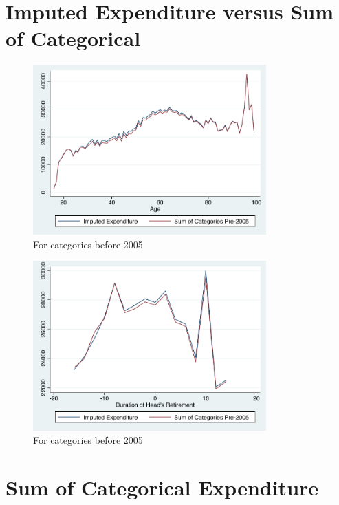 \documentclass[11pt,onecolumn]{article}
\numberwithin{figure}{section}
\begin{document}
\clearpage

\section{Imputed Expenditure versus Sum of Categorical}

\begin{figure}[h]
	\caption{For categories before 2005}
	\centering
	\includegraphics[width=0.8\textwidth]{../ConsumptionPostRetirement/Comparision_of_imputed_and_categorical_age.pdf}
\end{figure}

\begin{figure}[h]
	\caption{For categories before 2005}
	\centering
	\includegraphics[width=0.8\textwidth]{../ConsumptionPostRetirement/Comparision_of_imputed_and_categorical_ret.pdf}
\end{figure}
\clearpage


\section{Sum of Categorical Expenditure}
\end{document}
